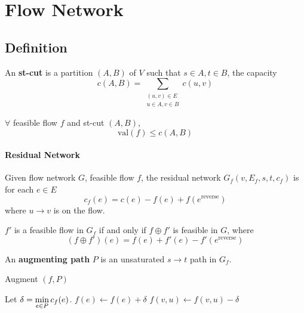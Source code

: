 \section{Flow Network}
\subsection{Definition}
\newcommand{\val}{\mathrm{val}}
An \textbf{st-cut} is a partition  $ (A,B) $ of  $ V $ such that  $ s\in A,t\in B $, the capacity 
\[c(A,B)=\sum_{\substack{(u,v)\in E\\u\in A,v\in B}}c(u,v)\]   
\begin{claim}
    $ \forall  $ feasible flow  $ f $ and st-cut  $ (A,B) $, 
    \[\val(f) \leq c(A,B)\]  
\end{claim}
\paragraph{Residual Network} Given flow network  $ G $, feasible flow  $ f $, the residual network $ G_f(v,E_f,s,t,c_f) $ is for each  $ e\in E $ 
\[c_f(e)=c(e)-f(e)+f(e^{\mathrm{reverse}})\]
where  $ u\to v $ is on the flow.
\begin{claim}
    $ f' $ is a feasible flow in  $ G_f $ if and only if  $ f\oplus f' $ is feasible in  $ G $, where 
    \[(f\oplus f')(e)=f(e)+f'(e)-f'(e^{\mathrm{reverse}})\]    
\end{claim}     

An \textbf{augmenting path}  $ P $ is an unsaturated  $ s\to t $ path in  $ G_f $.

\begin{algorithm}
    \caption{Augment $ (f,P) $}
    \begin{algorithmic}[1]
        \STATE Let  $ \delta=\displaystyle\min_{e\in P}c_f(e) $.
            \STATE$ f(e)\leftarrow f(e)+\delta $
            \ELSE \STATE $ f(v,u)\leftarrow f(v,u)-\delta $
            \ENDIF
        \ENDFOR
    \end{algorithmic}
\end{algorithm}


